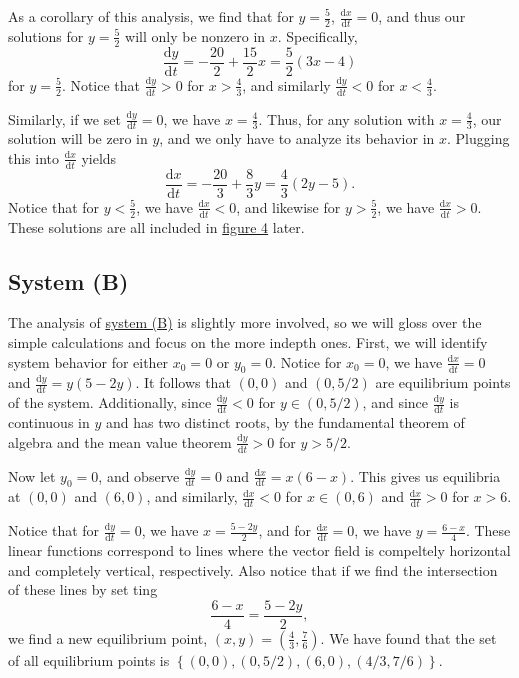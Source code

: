 \documentclass[11pt, letterpaper]{article}
\begin{document}
As a corollary of this analysis, we find that for $y=\frac{5}{2}$, $\frac{\mathrm{d}x}{\mathrm{d}t} =0$, and thus our solutions for $y=\frac{5}{2}$ will only be nonzero in $x$. Specifically,
\[
	\frac{\mathrm{d}y}{\mathrm{d}t} =-\frac{20}{2}+\frac{15}{2}x=\frac{5}{2}\left( 3x-4 \right) 
	\]
for $y=\frac{5}{2}$. Notice that $\frac{\mathrm{d}y}{\mathrm{d}t} >0$ for $x>\frac{4}{3}$, and similarly $\frac{\mathrm{d}y}{\mathrm{d}t} <0$ for $x<\frac{4}{3}$.

Similarly, if we set $\frac{\mathrm{d}y}{\mathrm{d}t} =0$, we have $x=\frac{4}{3}$. Thus, for any solution with $x=\frac{4}{3}$, our solution will be zero in $y$, and we only have to analyze its behavior in $x$. Plugging this into $\frac{\mathrm{d}x}{\mathrm{d}t} $ yields
\[
	\frac{\mathrm{d}x}{\mathrm{d}t} =-\frac{20}{3}+\frac{8}{3}y=\frac{4}{3}\left( 2y-5 \right) 
.\]
Notice that for $y<\frac{5}{2}$, we have $\frac{\mathrm{d}x}{\mathrm{d}t} <0$, and likewise for $y>\frac{5}{2}$, we have $\frac{\mathrm{d}x}{\mathrm{d}t} >0$. These solutions are all included in \hyperref[fig:4]{figure 4} later.

\subsection{System (B)}
The analysis of \hyperref[sys]{system (B)} is slightly more involved, so we will gloss over the simple calculations and focus on the more indepth ones. First, we will identify system behavior for either $x_0=0$ or $y_0=0$. Notice for $x_0=0$, we have $\frac{\mathrm{d}x}{\mathrm{d}t} =0$ and $\frac{\mathrm{d}y}{\mathrm{d}t} =y(5-2y)$. It follows that $(0,0)$ and $(0,5 / 2)$ are equilibrium points of the system. Additionally, since $\frac{\mathrm{d}y}{\mathrm{d}t} <0$ for $y\in(0,5 / 2)$, and since $\frac{\mathrm{d}y}{\mathrm{d}t} $ is continuous in $y$ and has two distinct roots, by the fundamental theorem of algebra and the mean value theorem $\frac{\mathrm{d}y}{\mathrm{d}t} >0$ for $y>5 / 2$.

Now let $y_0=0$, and observe $\frac{\mathrm{d}y}{\mathrm{d}t} =0$ and $\frac{\mathrm{d}x}{\mathrm{d}t} =x(6-x)$. This gives us equilibria at $(0,0)$ and $(6,0)$, and similarly, $\frac{\mathrm{d}x}{\mathrm{d}t} <0$ for $x\in(0,6)$ and $\frac{\mathrm{d}x}{\mathrm{d}t} >0$ for $x>6$.

Notice that for $\frac{\mathrm{d}y}{\mathrm{d}t} =0$, we have $x=\frac{5-2y}{2}$, and for $\frac{\mathrm{d}x}{\mathrm{d}t} =0$, we have $y=\frac{6-x}{4}$. These linear functions correspond to lines where the vector field is compeltely horizontal and completely vertical, respectively. Also notice that if we find the intersection of these lines by set ting
\[
	\frac{6-x}{4}=\frac{5-2y}{2}
,\]
we find a new equilibrium point, $(x,y)=\left( \frac{4}{3},\frac{7}{6} \right) $. We have found that the set of all equilibrium points is $\left\{ (0,0),(0,5 / 2),(6,0),(4 / 3,7 / 6) \right\} $.
\end{document}
